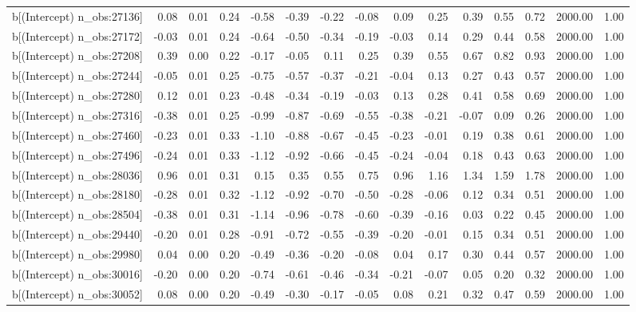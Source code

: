 \begin{table}[ht]
\begin{tabular}{rrrrrrrrrrrrrrr}
  b[(Intercept) n\_obs:27136] & 0.08 & 0.01 & 0.24 & -0.58 & -0.39 & -0.22 & -0.08 & 0.09 & 0.25 & 0.39 & 0.55 & 0.72 & 2000.00 & 1.00 \\ 
  b[(Intercept) n\_obs:27172] & -0.03 & 0.01 & 0.24 & -0.64 & -0.50 & -0.34 & -0.19 & -0.03 & 0.14 & 0.29 & 0.44 & 0.58 & 2000.00 & 1.00 \\ 
  b[(Intercept) n\_obs:27208] & 0.39 & 0.00 & 0.22 & -0.17 & -0.05 & 0.11 & 0.25 & 0.39 & 0.55 & 0.67 & 0.82 & 0.93 & 2000.00 & 1.00 \\ 
  b[(Intercept) n\_obs:27244] & -0.05 & 0.01 & 0.25 & -0.75 & -0.57 & -0.37 & -0.21 & -0.04 & 0.13 & 0.27 & 0.43 & 0.57 & 2000.00 & 1.00 \\ 
  b[(Intercept) n\_obs:27280] & 0.12 & 0.01 & 0.23 & -0.48 & -0.34 & -0.19 & -0.03 & 0.13 & 0.28 & 0.41 & 0.58 & 0.69 & 2000.00 & 1.00 \\ 
  b[(Intercept) n\_obs:27316] & -0.38 & 0.01 & 0.25 & -0.99 & -0.87 & -0.69 & -0.55 & -0.38 & -0.21 & -0.07 & 0.09 & 0.26 & 2000.00 & 1.00 \\ 
  b[(Intercept) n\_obs:27460] & -0.23 & 0.01 & 0.33 & -1.10 & -0.88 & -0.67 & -0.45 & -0.23 & -0.01 & 0.19 & 0.38 & 0.61 & 2000.00 & 1.00 \\ 
  b[(Intercept) n\_obs:27496] & -0.24 & 0.01 & 0.33 & -1.12 & -0.92 & -0.66 & -0.45 & -0.24 & -0.04 & 0.18 & 0.43 & 0.63 & 2000.00 & 1.00 \\ 
  b[(Intercept) n\_obs:28036] & 0.96 & 0.01 & 0.31 & 0.15 & 0.35 & 0.55 & 0.75 & 0.96 & 1.16 & 1.34 & 1.59 & 1.78 & 2000.00 & 1.00 \\ 
  b[(Intercept) n\_obs:28180] & -0.28 & 0.01 & 0.32 & -1.12 & -0.92 & -0.70 & -0.50 & -0.28 & -0.06 & 0.12 & 0.34 & 0.51 & 2000.00 & 1.00 \\ 
  b[(Intercept) n\_obs:28504] & -0.38 & 0.01 & 0.31 & -1.14 & -0.96 & -0.78 & -0.60 & -0.39 & -0.16 & 0.03 & 0.22 & 0.45 & 2000.00 & 1.00 \\ 
  b[(Intercept) n\_obs:29440] & -0.20 & 0.01 & 0.28 & -0.91 & -0.72 & -0.55 & -0.39 & -0.20 & -0.01 & 0.15 & 0.34 & 0.51 & 2000.00 & 1.00 \\ 
  b[(Intercept) n\_obs:29980] & 0.04 & 0.00 & 0.20 & -0.49 & -0.36 & -0.20 & -0.08 & 0.04 & 0.17 & 0.30 & 0.44 & 0.57 & 2000.00 & 1.00 \\ 
  b[(Intercept) n\_obs:30016] & -0.20 & 0.00 & 0.20 & -0.74 & -0.61 & -0.46 & -0.34 & -0.21 & -0.07 & 0.05 & 0.20 & 0.32 & 2000.00 & 1.00 \\ 
  b[(Intercept) n\_obs:30052] & 0.08 & 0.00 & 0.20 & -0.49 & -0.30 & -0.17 & -0.05 & 0.08 & 0.21 & 0.32 & 0.47 & 0.59 & 2000.00 & 1.00 \\ 

\end{tabular}
\end{table}
